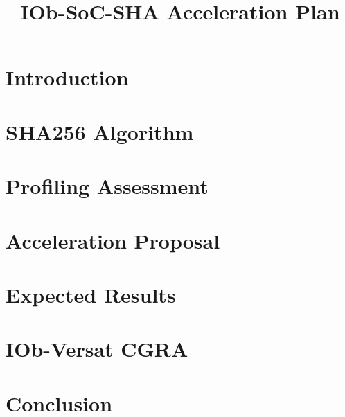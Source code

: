 \documentclass{plan}
\title{IOb-SoC-SHA Acceleration  Plan}
\begin{document}
\maketitle
\cleardoublepage
\tableofcontents
\listoftables
\listoffigures
\cleardoublepage

\section{Introduction}
\label{sec:intro}


\section{SHA256 Algorithm}
\label{sec:sha256}


\section{Profiling Assessment}
\label{sec:profiling}


\section{Acceleration Proposal}
\label{sec:accel_proposal}


\section{Expected Results}
\label{sec:expected_results}


\section{IOb-Versat CGRA}
\label{sec:versat_CGRA}


\section{Conclusion}
\label{sec:conclusion}


{}


\end{document}
